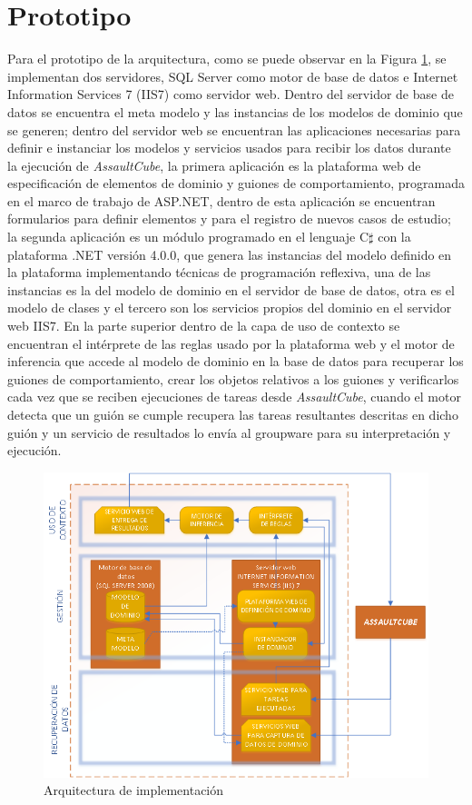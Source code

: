 \section{Prototipo}

Para el prototipo de la arquitectura, como se puede observar en la Figura \ref{imp:Implementacion}, se implementan dos servidores, SQL Server como motor de base de datos e Internet Information Services 7 (IIS7) como servidor web. Dentro del servidor de base de datos se encuentra el  meta modelo y las instancias de los modelos de dominio que se generen; dentro del servidor web se encuentran las aplicaciones necesarias para definir e instanciar los modelos y servicios usados para recibir los datos durante la ejecuci\'on de \textit{AssaultCube}, la primera aplicaci\'on es la plataforma web de especificaci\'on de elementos de dominio y guiones de comportamiento, programada en el marco de trabajo de ASP.NET, dentro de esta aplicaci\'on se encuentran formularios para definir elementos y para el registro de nuevos casos de estudio; la segunda aplicaci\'on es un m\'odulo programado en el lenguaje C$\sharp$ con la plataforma .NET versi\'on 4.0.0,  que genera las instancias del modelo definido en la plataforma implementando t\'ecnicas de programaci\'on reflexiva, una de las instancias es la del modelo de dominio en el servidor de base de datos, otra es el modelo de clases y el tercero son los servicios propios del dominio en el servidor web IIS7. En la parte superior dentro de la capa de uso de contexto se encuentran el int\'erprete de las reglas usado por la plataforma web y el motor de inferencia que accede al modelo de dominio en la base de datos para recuperar los guiones de comportamiento, crear los objetos relativos a los guiones y verificarlos cada vez que se reciben ejecuciones de tareas desde \textit{AssaultCube}, cuando el motor detecta que un gui\'on se cumple recupera las tareas resultantes descritas en dicho gui\'on y un servicio de resultados lo env\'ia al groupware para su interpretaci\'on y ejecuci\'on. 

\begin{figure}[h]
\centering
\includegraphics[width=0.7\linewidth]{images/arquitecturaImplementacion}
\caption{Arquitectura de implementaci\'on}
\label{imp:Implementacion}
\end{figure}

